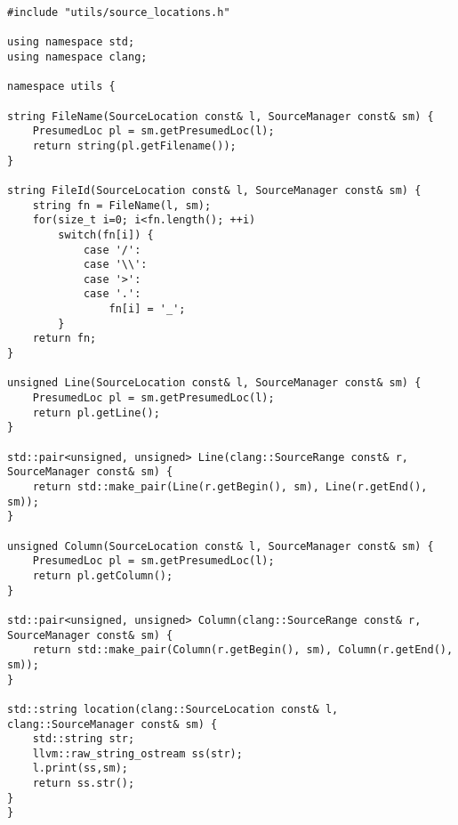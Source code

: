 \documentclass[a4paper,10pt,twoside]{book}
\begin{document}
\begin{lstlisting}[language=CCC, caption=utilis/source\_locations.cpp]
#include "utils/source_locations.h"

using namespace std;
using namespace clang;

namespace utils {

string FileName(SourceLocation const& l, SourceManager const& sm) {
	PresumedLoc pl = sm.getPresumedLoc(l);
	return string(pl.getFilename());
}

string FileId(SourceLocation const& l, SourceManager const& sm) {
	string fn = FileName(l, sm);
	for(size_t i=0; i<fn.length(); ++i)
		switch(fn[i]) {
			case '/':
			case '\\':
			case '>':
			case '.':
				fn[i] = '_';
		}
	return fn;
}

unsigned Line(SourceLocation const& l, SourceManager const& sm) {
	PresumedLoc pl = sm.getPresumedLoc(l);
	return pl.getLine();
}

std::pair<unsigned, unsigned> Line(clang::SourceRange const& r, SourceManager const& sm) {
	return std::make_pair(Line(r.getBegin(), sm), Line(r.getEnd(), sm));
}

unsigned Column(SourceLocation const& l, SourceManager const& sm) {
	PresumedLoc pl = sm.getPresumedLoc(l);
	return pl.getColumn();
}

std::pair<unsigned, unsigned> Column(clang::SourceRange const& r, SourceManager const& sm) {
	return std::make_pair(Column(r.getBegin(), sm), Column(r.getEnd(), sm));
}

std::string location(clang::SourceLocation const& l, clang::SourceManager const& sm) {
	std::string str;
	llvm::raw_string_ostream ss(str);
	l.print(ss,sm);
	return ss.str();
}
}
\end{lstlisting}
\end{document}
